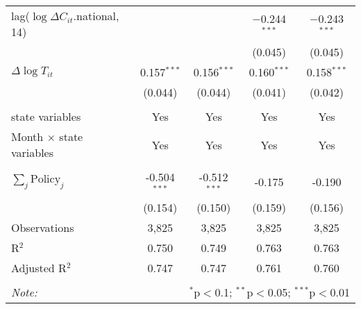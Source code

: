 \begin{tabular}{@{\extracolsep{1pt}}lcccc}
  lag($\log \Delta C_{it}$.national, 14) &  &  & $-$0.244$^{***}$ & $-$0.243$^{***}$ \\ 
  &  &  & (0.045) & (0.045) \\ 
  $\Delta \log T_{it}$ & 0.157$^{***}$ & 0.156$^{***}$ & 0.160$^{***}$ & 0.158$^{***}$ \\ 
  & (0.044) & (0.044) & (0.041) & (0.042) \\ 
 \hline \\[-1.8ex] 
state variables & Yes & Yes & Yes & Yes \\ 
Month $\times$ state variables & Yes & Yes & Yes & Yes \\ 
\hline \\[-1.8ex] 
$\sum_j \mathrm{Policy}_j$ & -0.504$^{***}$ & -0.512$^{***}$ & -0.175 & -0.190 \\ 
 & (0.154) & (0.150) & (0.159) & (0.156) \\ 
Observations & 3,825 & 3,825 & 3,825 & 3,825 \\ 
R$^{2}$ & 0.750 & 0.749 & 0.763 & 0.763 \\ 
Adjusted R$^{2}$ & 0.747 & 0.747 & 0.761 & 0.760 \\ 
\hline 
\hline \\[-1.8ex] 
\textit{Note:}  & \multicolumn{4}{r}{$^{*}$p$<$0.1; $^{**}$p$<$0.05; $^{***}$p$<$0.01} \\ 
\end{tabular} 